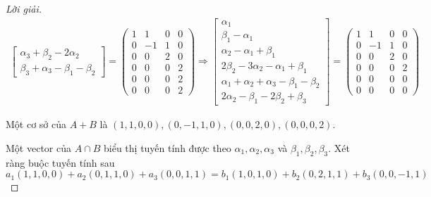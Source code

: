 \begin{proof}[Lời giải]
\begin{align*}
\begin{bmatrix}
            \alpha_{3} + \beta_{2} - 2\alpha_{2}              \\
            \beta_{3} + \alpha_{3} - \beta_{1} - \beta_{2}
        \end{bmatrix}=
        \begin{pmatrix}
            1 & 1  & 0 & 0 \\
            0 & -1 & 1 & 0 \\
            0 & 0  & 2 & 0 \\
            0 & 0  & 0 & 2 \\
            0 & 0  & 0 & 2 \\
            0 & 0  & 0 & 2
        \end{pmatrix}
        \Longrightarrow
        \begin{bmatrix}
            \alpha_{1}                                                   \\
            \beta_{1} - \alpha_{1}                                       \\
            \alpha_{2} - \alpha_{1} + \beta_{1}                          \\
            2\beta_{2} - 3\alpha_{2} - \alpha_{1} + \beta_{1}            \\
            \alpha_{1} + \alpha_{2} + \alpha_{3} - \beta_{1} - \beta_{2} \\
            2\alpha_{2} - \beta_{1} - 2\beta_{2} + \beta_{3}
        \end{bmatrix}=
        \begin{pmatrix}
            1 & 1  & 0 & 0 \\
            0 & -1 & 1 & 0 \\
            0 & 0  & 2 & 0 \\
            0 & 0  & 0 & 2 \\
            0 & 0  & 0 & 0 \\
            0 & 0  & 0 & 0
        \end{pmatrix}
    \end{align*}
    
    Một cơ sở của $A + B$ là $(1,1,0,0), (0,-1,1,0), (0,0,2,0), (0,0,0,2)$.
    
    Một vector của $A\cap B$ biểu thị tuyến tính được theo $\alpha_{1}, \alpha_{2}, \alpha_{3}$ và $\beta_{1}, \beta_{2}, \beta_{3}$. Xét ràng buộc tuyến tính sau
    \[ a_{1}(1,1,0,0) + a_{2}(0,1,1,0) + a_{3}(0,0,1,1) = b_{1}(1,0,1,0) + b_{2}(0,2,1,1) + b_{3}(0,0,-1,1) \]
    

\end{proof}
